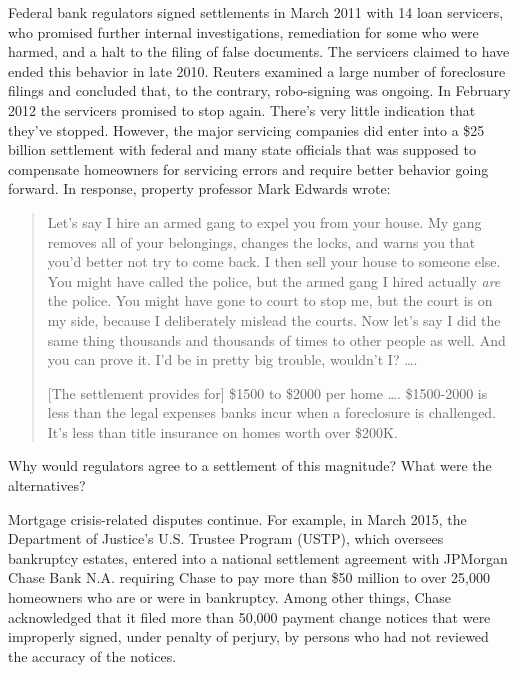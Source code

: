 Federal bank regulators signed settlements in March 2011 with 14 loan servicers,
who promised further internal investigations, remediation for some who were
harmed, and a halt to the filing of false documents. The servicers claimed to
have ended this behavior in late 2010. Reuters examined a large number of
foreclosure filings and concluded that, to the contrary, robo-signing was
ongoing. In February 2012 the servicers promised to stop again. There's very
little indication that they've stopped. However, the major servicing companies
did enter into a \$25 billion settlement with federal and many state officials
that was supposed to compensate homeowners for servicing errors and require
better behavior going forward. In response, property professor Mark Edwards
wrote:
\begin{quotation}
Let's say I hire an armed gang to expel you from your house.  My gang removes
all of your belongings, changes the locks, and warns you that you'd better not
try to come back.  I then sell your house to someone else. You might have
called the police, but the armed gang I hired actually \textit{are} the
police.  You might have gone to court to stop me, but the court is on my
side, because I deliberately mislead the courts. Now let's say I did the same
thing thousands and thousands of times to other people as well. And you can
prove it. I'd be in pretty big trouble, wouldn't I?  \dots .

[The settlement provides for] \$1500 to \$2000 per home \dots . \$1500-2000 is
less than the legal expenses banks incur when a foreclosure is challenged. 
It's less than title insurance on homes worth over \$200K.
\end{quotation}
Why would regulators agree to a settlement of this magnitude? What were the
alternatives? 

Mortgage crisis-related disputes continue. For example, in March 2015, the
Department of Justice's U.S. Trustee Program (USTP), which oversees bankruptcy
estates, entered into a national settlement agreement with JPMorgan Chase Bank
N.A. requiring Chase to pay more than \$50 million to over 25,000 homeowners
who are or were in bankruptcy. Among other things, Chase acknowledged that it
filed more than 50,000 payment change notices that were improperly signed,
under penalty of perjury, by persons who had not reviewed the accuracy of the
notices.

